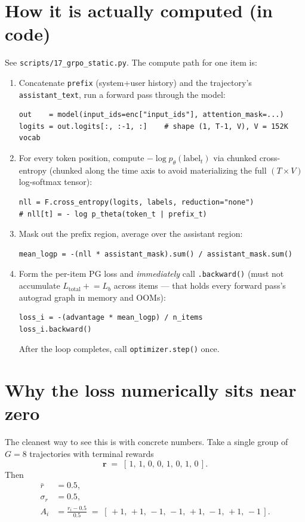 \documentclass[11pt,a4paper]{article}
\begin{document}
\section{How it is actually computed (in code)}

See \texttt{scripts/17\_grpo\_static.py}. The compute path for one item is:

\begin{enumerate}[leftmargin=2em]
\item Concatenate \texttt{prefix} (system+user history) and the trajectory's
\texttt{assistant\_text}, run a forward pass through the model:
\begin{verbatim}
out    = model(input_ids=enc["input_ids"], attention_mask=...)
logits = out.logits[:, :-1, :]    # shape (1, T-1, V), V = 152K vocab
\end{verbatim}

\item For every token position, compute $-\log p_\theta(\text{label}_t)$ via
chunked cross-entropy (chunked along the time axis to avoid materializing
the full $(T \times V)$ log-softmax tensor):
\begin{verbatim}
nll = F.cross_entropy(logits, labels, reduction="none")
# nll[t] = - log p_theta(token_t | prefix_t)
\end{verbatim}

\item Mask out the prefix region, average over the assistant region:
\begin{verbatim}
mean_logp = -(nll * assistant_mask).sum() / assistant_mask.sum()
\end{verbatim}

\item Form the per-item PG loss and \emph{immediately} call
\texttt{.backward()} (must not accumulate
$L_{\text{total}} \mathrel{+}= L_b$ across items --- that holds every
forward pass's autograd graph in memory and OOMs):
\begin{verbatim}
loss_i = -(advantage * mean_logp) / n_items
loss_i.backward()
\end{verbatim}
After the loop completes, call \texttt{optimizer.step()} once.
\end{enumerate}

\section{Why the loss numerically sits near zero}
\label{sec:near_zero}

The cleanest way to see this is with concrete numbers. Take a single group
of $G = 8$ trajectories with terminal rewards
\[
\mathbf{r} \;=\; [\,1,\,1,\,0,\,0,\,1,\,0,\,1,\,0\,].
\]
Then
\begin{align}
\bar r &= 0.5,\\
\sigma_r &= 0.5,\\
A_i &= \frac{r_i - 0.5}{0.5} \;=\; [\,+1,\,+1,\,-1,\,-1,\,+1,\,-1,\,+1,\,-1\,].
\end{align}
\end{document}
